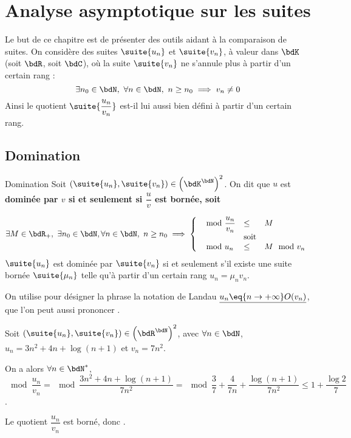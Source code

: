 \documentclass[a4paper,french,bookmarks]{article}
\begin{document}
\initcours


\section{Analyse asymptotique sur les suites}
Le but de ce chapitre est de présenter des outils aidant à la comparaison de suites. On considère des suites $\suite{u_n}$ et $\suite{v_n}$, à valeur dans $\bdK$ (soit $\bdR$, soit $\bdC$), où la suite  $\suite{v_n}$ ne s'annule plus à partir d'un certain rang :
\[ \exists n_0 \in \bdN,\ \forall n \in \bdN,\ n \geq n_0 \implies v_n \neq 0\]
Ainsi le quotient $\suite{\dfrac{u_n}{v_n}}$ est-il lui aussi bien défini à partir d'un certain rang.


\subsection{Domination}
\begin{definition}{Domination}{}
    Soit $\left(\suite{u_n}, \suite{v_n}\right) \in \left(\bdK^\bdN\right)^2$. On dit que $u$ est \bf{dominée} par $v$ si et seulement si $\dfrac{u}{v}$ est bornée, soit
    
    \[ \exists M \in \bdR_+,\ \exists n_0 \in \bdN, \forall n \in \bdN,\ n \geq n_0 \implies \left\lbrace\begin{array}{lll}
        \mod{\dfrac{u_n}{v_n}} &\leq& M \\
        &\text{soit}&\\
        \mod{u_n} &\leq& M \mod{v_n}
    \end{array}\right.\]
     $\suite{u_n}$ est dominée par $\suite{v_n}$ si et seulement s’il existe une suite bornée $\suite{\mu_n}$ telle qu'à partir d'un certain rang $u_n = \mu_nv_n$.
\end{definition}

On utilise pour désigner la phrase  la notation de Landau $\underline{u_n \eq{n \to +\infty} O(v_n)}$, que l'on peut aussi prononcer .

\begin{example}{}{}
    Soit $\left(\suite{u_n}, \suite{v_n}\right) \in \left(\bdR^\bdN\right)^2$, avec $\forall n \in \bdN$, $u_n = 3n^2 + 4n + \log (n+1)$ et $v_n = 7n^2$.
    
    On a alors $\forall n \in \bdN^*$, $\mod{\dfrac{u_n}{v_n}} = \mod{\dfrac{3n^2+4n+\log (n+1)}{7n^2}}=\mod{\dfrac{3}{7} + \dfrac{4}{7n} + \dfrac{\log (n+1)}{7n^2}} \leq 1 + \dfrac{\log 2}{7}$.
    
    Le quotient $\dfrac{u_n}{v_n}$ est borné, donc .
\end{example}
\end{document}
